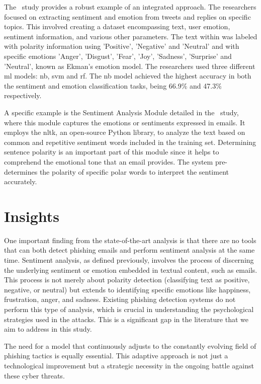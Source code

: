 

The~\citet{SAILUNAZ2019101003} study provides a robust example of an integrated approach. The researchers focused on extracting sentiment and emotion from tweets and replies on specific topics. This involved creating a dataset encompassing text, user emotion, sentiment information, and various other parameters. The text within was labeled with polarity information using 'Positive', 'Negative' and 'Neutral' and with
specific emotions 'Anger', 'Disgust', 'Fear', 'Joy', 'Sadness', 'Surprise' and 'Neutral', known as Ekman's emotion model. The researchers used three different \ac{ml} models: \ac{nb}, \ac{svm} and \ac{rf}. The \ac{nb} model achieved the highest accuracy in both the sentiment and emotion classification tasks, being 66.9\% and 47.3\% respectively.

A specific example is the Sentiment Analysis Module detailed in the~\citet{10085351} study, where this module captures the emotions or sentiments expressed in emails. It employs the \ac{nltk}, an open-source Python library, to analyze the text based on common and repetitive sentiment words included in the training set. Determining sentence polarity is an important part of this module since it helps to comprehend the emotional tone that an email provides. The system pre-determines the polarity of specific polar words to interpret the sentiment accurately. 



\section{Insights}

One important finding from the state-of-the-art analysis is that there are no tools that can both detect phishing emails and perform sentiment analysis at the same time. Sentiment analysis, as defined previously, involves the process of discerning the underlying sentiment or emotion embedded in textual content, such as emails. This process is not merely about polarity detection (classifying text as positive, negative, or neutral) but extends to identifying specific emotions like happiness, frustration, anger, and sadness. Existing phishing detection systems do not perform this type of analysis, which is crucial in understanding the psychological strategies used in the attacks. This is a significant gap in the literature that we aim to address in this study.

The need for a model that continuously adjusts to the constantly evolving field of phishing tactics is equally essential. This adaptive approach is not just a technological improvement but a strategic necessity in the ongoing battle against these cyber threats.


